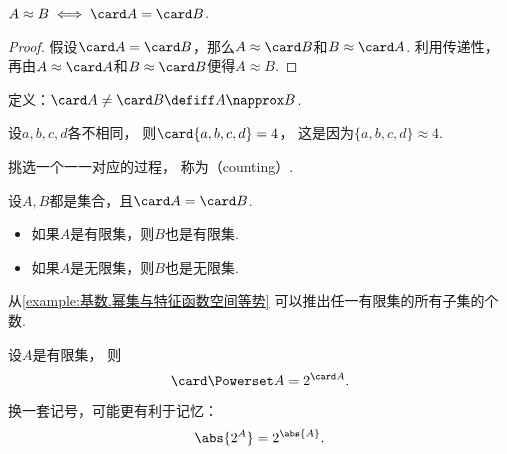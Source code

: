 \begin{property}
\(A \approx B \iff \card A = \card B\).
\begin{proof}
假设\(\card A = \card B\)，那么\(A \approx \card B\)和\(B \approx \card A\).
利用传递性，再由\(A \approx \card A\)和\(B \approx \card B\)便得\(A \approx B\).
\end{proof}
\end{property}

\begin{definition}
定义：\(\card A \neq \card B \defiff A \napprox B\).
\end{definition}

\begin{example}
设\(a,b,c,d\)各不相同，
则\(\card\{a,b,c,d\} = 4\)，
这是因为\(\{a,b,c,d\} \approx 4\).
\end{example}

挑选一个一一对应的过程，
称为（counting）.

\begin{property}
设\(A,B\)都是集合，且\(\card A = \card B\).
\begin{itemize}
	\item 如果\(A\)是有限集，则\(B\)也是有限集.
	\item 如果\(A\)是无限集，则\(B\)也是无限集.
\end{itemize}
\end{property}

从\cref{example:基数.幂集与特征函数空间等势} 可以推出任一有限集的所有子集的个数.
\begin{theorem}
设\(A\)是有限集，
则\begin{equation}
	\card \Powerset A
	= 2^{\card A}.
\end{equation}
\end{theorem}
\begin{remark}
换一套记号，可能更有利于记忆：\begin{equation*}
	\abs{2^A}
	= 2^{\abs{A}}.
\end{equation*}
\end{remark}

